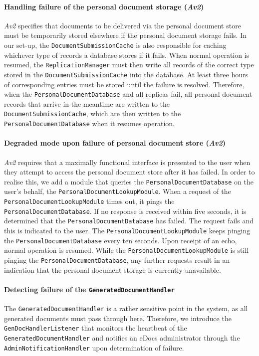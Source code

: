 \documentclass[a4paper,10pt]{article}
\begin{document}
\paragraph{Handling failure of the personal document storage (\emph{Av2})}
\emph{Av2} specifies that documents to be delivered via the personal document store must be temporarily stored elsewhere if the personal document storage fails. In our set-up, the \texttt{DocumentSubmissionCache} is also responsible for caching whichever type of records a database stores if it fails. When normal operation is resumed, the \texttt{ReplicationManager} must then write all records of the correct type stored in the \texttt{DocumentSubmissionCache} into the database. At least three hours of corresponding entries must be stored until the failure is resolved. Therefore, when the \texttt{PersonalDocumentDatabase} and all replicas fail, all personal document records that arrive in the meantime are written to the \texttt{DocumentSubmissionCache}, which are then written to the \texttt{PersonalDocumentDatabase} when it resumes operation.

\paragraph{Degraded mode upon failure of personal document store (\emph{Av2})}
\emph{Av2} requires that a maximally functional interface is presented to the user when they attempt to access the personal document store after it has failed. In order to realise this, we add a module that queries the \texttt{PersonalDocumentDatabase} on the user's behalf, the \texttt{PersonalDocumentLookupModule}. When a request of the \texttt{PersonalDocumentLookupModule} times out, it pings the \texttt{PersonalDocumentDatabase}. If no response is received within five seconds, it is determined that the \texttt{PersonalDocumentDatabase} has failed. The request fails and this is indicated to the user. The \texttt{PersonalDocumentLookupModule} keeps pinging the \texttt{PersonalDocumentDatabase} every ten seconds. Upon receipt of an echo, normal operation is resumed. While the \texttt{PersonalDocumentLookupModule} is still pinging the \texttt{PersonalDocumentDatabase}, any further requests result in an indication that the personal document storage is currently unavailable.

\paragraph{Detecting failure of the \texttt{GeneratedDocumentHandler}}
The \texttt{GeneratedDocumentHandler} is a rather sensitive point in the system, as all generated documents must pass through here. Therefore, we introduce the \texttt{GenDocHandlerListener} that monitors the heartbeat of the \texttt{GeneratedDocumentHandler} and notifies an eDocs administrator through the \texttt{AdminNotificationHandler} upon determination of failure.
\end{document}

